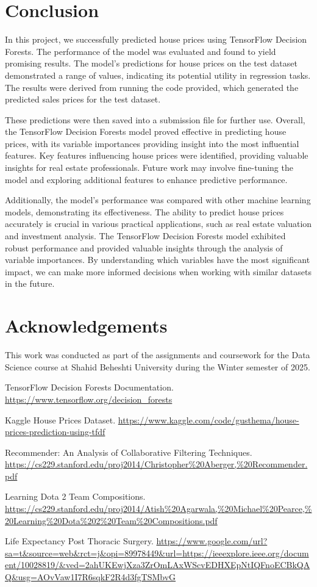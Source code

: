 \documentclass{article}
\begin{document}
\section{Conclusion}
In this project, we successfully predicted house prices using TensorFlow Decision Forests. The performance of the model was evaluated and found to yield promising results. The model's predictions for house prices on the test dataset demonstrated a range of values, indicating its potential utility in regression tasks. The results were derived from running the code provided, which generated the predicted sales prices for the test dataset.

These predictions were then saved into a submission file for further use. Overall, the TensorFlow Decision Forests model proved effective in predicting house prices, with its variable importances providing insight into the most influential features. Key features influencing house prices were identified, providing valuable insights for real estate professionals. Future work may involve fine-tuning the model and exploring additional features to enhance predictive performance. 

Additionally, the model's performance was compared with other machine learning models, demonstrating its effectiveness. The ability to predict house prices accurately is crucial in various practical applications, such as real estate valuation and investment analysis. The TensorFlow Decision Forests model exhibited robust performance and provided valuable insights through the analysis of variable importances. By understanding which variables have the most significant impact, we can make more informed decisions when working with similar datasets in the future.

\section*{Acknowledgements}
This work was conducted as part of the assignments and coursework for the Data Science course at Shahid Beheshti University during the Winter semester of 2025.


\begin{thebibliography}{9}
TensorFlow Decision Forests Documentation. 
\url{https://www.tensorflow.org/decision_forests}

Kaggle House Prices Dataset. 
\url{https://www.kaggle.com/code/gusthema/house-prices-prediction-using-tfdf}

Recommender: An Analysis of Collaborative Filtering Techniques. 
\url{https://cs229.stanford.edu/proj2014/Christopher%20Aberger,%20Recommender.pdf}

Learning Dota 2 Team Compositions. 
\url{https://cs229.stanford.edu/proj2014/Atish%20Agarwala,%20Michael%20Pearce,%20Learning%20Dota%202%20Team%20Compositions.pdf}

Life Expectancy Post Thoracic Surgery. 
\url{https://www.google.com/url?sa=t&source=web&rct=j&opi=89978449&url=https://ieeexplore.ieee.org/document/10028819/&ved=2ahUKEwjXza3ZrOmLAxWScvEDHXEpNtIQFnoECBkQAQ&usg=AOvVaw1I7R6sqkF2R4d3fgTSMbvG}
\end{thebibliography}
\end{document}

